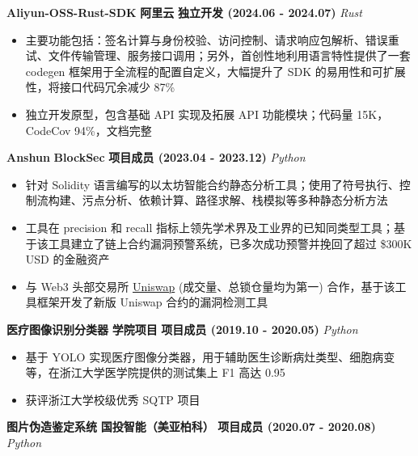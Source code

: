     \noindent \textbf{Aliyun-OSS-Rust-SDK} \textbar{} \textbf{阿里云} \textbar{} \textbf{独立开发 (2024.06 - 2024.07)} \hfill
    \textsl{Rust}

    \begin{itemize}
        \item 主要功能包括：签名计算与身份校验、访问控制、请求响应包解析、错误重试、文件传输管理、服务接口调用；另外，首创性地利用语言特性提供了一套 codegen 框架用于全流程的配置自定义，大幅提升了 SDK 的易用性和可扩展性，将接口代码冗余减少 87\%
        \item 独立开发原型，包含基础 API 实现及拓展 API 功能模块；代码量 15K，CodeCov 94\%，文档完整
    \end{itemize}

    \noindent \textbf{Anshun} \textbar{} \textbf{BlockSec} \textbar{} \textbf{项目成员 (2023.04 - 2023.12)} \hfill
    \textsl{Python}

    \begin{itemize}
        \item 针对 Solidity 语言编写的以太坊智能合约静态分析工具；使用了符号执行、控制流构建、污点分析、依赖计算、路径求解、栈模拟等多种静态分析方法
        \item 工具在 precision 和 recall 指标上领先学术界及工业界的已知同类型工具；基于该工具建立了链上合约漏洞预警系统，已多次成功预警并挽回了超过 \$300K USD 的金融资产
        \item 与 Web3 头部交易所 \href{https://defillama.com/protocols/Dexes}{Uniswap} (成交量、总锁仓量均为第一) 合作，基于该工具框架开发了新版 Uniswap 合约的漏洞检测工具
    \end{itemize}

    \ifdefined\qr

        \noindent \textbf{医疗图像识别分类器} \textbar{} \textbf{学院项目} \textbar{} \textbf{项目成员 (2019.10 - 2020.05)} \hfill
        \textsl{Python}

        \begin{itemize}
            \item 基于 YOLO 实现医疗图像分类器，用于辅助医生诊断病灶类型、细胞病变等，在浙江大学医学院提供的测试集上 F1 高达 0.95
            \item 获评浙江大学校级优秀 SQTP 项目
        \end{itemize}

        \noindent \textbf{图片伪造鉴定系统} \textbar{} \textbf{国投智能（美亚柏科）} \textbar{} \textbf{项目成员 (2020.07 - 2020.08)} \hfill
        \textsl{Python}

